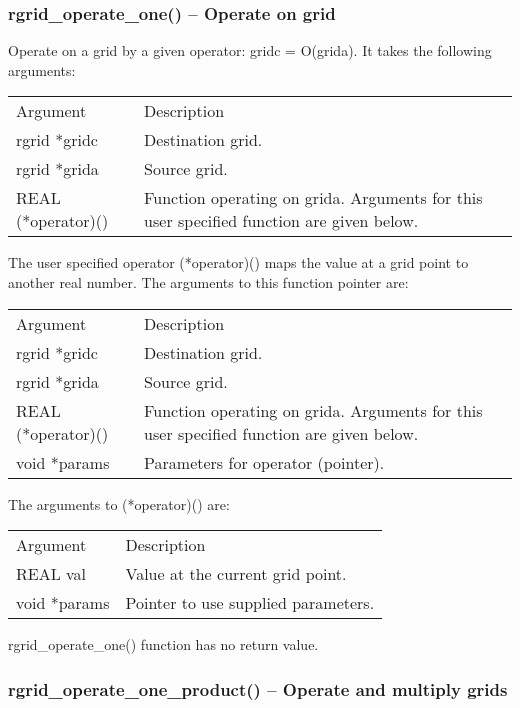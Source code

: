 \documentclass[12pt,letterpaper]{article}
\begin{document}
\subsubsection{rgrid\_operate\_one() -- Operate on grid}

Operate on a grid by a given operator: gridc = O(grida). It takes the following arguments:
\begin{longtable}{p{} p{}}
Argument & Description\\
\cline{1-2}
rgrid *gridc & Destination grid.\\
rgrid *grida & Source grid.\\
REAL (*operator)() & Function operating on grida. Arguments for this user specified function are given below.\\
\end{longtable}
\noindent
The user specified operator (*operator)() maps the value at a grid point to another real number. The arguments to this function pointer are:
\begin{longtable}{p{} p{}}
Argument & Description\\
\cline{1-2}
rgrid *gridc & Destination grid.\\
rgrid *grida & Source grid.\\
REAL (*operator)() & Function operating on grida. Arguments for this user specified function are given below.\\
void *params & Parameters for operator (pointer).\\
\end{longtable}
\noindent
The arguments to (*operator)() are:
\begin{longtable}{p{} p{}}
Argument & Description\\
\cline{1-2}
REAL val & Value at the current grid point.\\
void *params & Pointer to use supplied parameters.\\
\end{longtable}
\noindent
rgrid\_operate\_one() function has no return value.

\subsubsection{rgrid\_operate\_one\_product() -- Operate and multiply grids}
\end{document}
